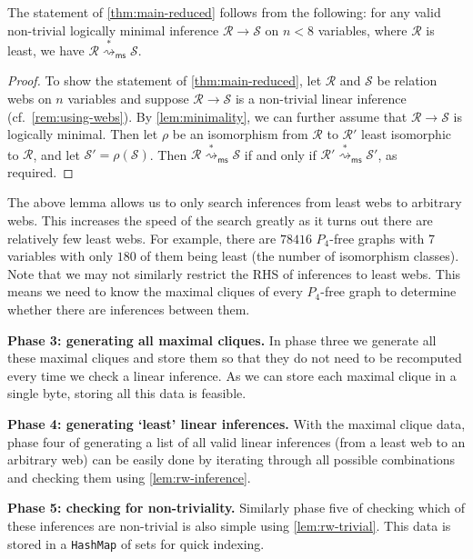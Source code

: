 \documentclass[a4paper, UKenglish, cleveref]{lipics-v2021}
\newcommand{\R}{\ensuremath{\mathcal{R}}}
\renewcommand*{\S}{\ensuremath{\mathcal{S}}}
\newcommand{\ms}{\ensuremath{\mathsf{ms}}}
\newcommand{\red}{\ensuremath{\overset{*}{\rightsquigarrow}}}
\newcommand{\redms}{\ensuremath{\red_\ms}}
\begin{document}
\begin{lemma}
  \label{lem:least}
  The statement of \cref{thm:main-reduced} follows from the following: for any valid non-trivial logically minimal inference $\R \to \S$ on $n<8$ variables, where  $\R$ is least, we have \(\R \redms \S\).
\end{lemma}
\begin{proof}
  To show the statement of \cref{thm:main-reduced}, let \(\R\) and \(\S\) be relation webs on \(n\) variables and suppose \(\R \to \S\) is a non-trivial linear inference (cf.~\cref{rem:using-webs}). 
  By \cref{lem:minimality}, we can further assume that \(\R \to \S\) is logically minimal.
   Then let \(\rho \) be an isomorphism from $\R$ to \(\R'\) least isomorphic to $\R$, and let \(\S' = \rho(\S)\). Then \(\R \redms \S\) if and only if \(\R' \redms \S'\), as required.
%
\end{proof}


The above lemma allows us to only search inferences from least webs to arbitrary webs. This increases the speed of the search greatly as it turns out there are relatively few least webs. 
For example, there are \(78416\) \(P_4\)-free graphs with 7 variables with only \(180\) of them being least (the number of isomorphism classes). 
Note that we may not similarly restrict the RHS of inferences to least webs. This means we need to know the maximal cliques of every \(P_4\)-free graph to determine whether there are inferences between them.

\smallskip

\textbf{Phase 3: generating all maximal cliques.}
In phase three we generate all these maximal cliques and store them so that they do not need to be recomputed every time we check a linear inference. As we can store each maximal clique in a single byte, storing all this data is feasible.

\smallskip

\textbf{Phase 4: generating `least' linear inferences.}
With the maximal clique data, phase four of generating a list of all valid linear inferences (from a least web to an arbitrary web) can be easily done by iterating through all possible combinations and checking them using \cref{lem:rw-inference}.

\smallskip

\textbf{Phase 5: checking for non-triviality.}
Similarly phase five of checking which of these inferences are non-trivial is also simple using \cref{lem:rw-trivial}. This data is stored in a \texttt{HashMap} of sets for quick indexing.
\end{document}
